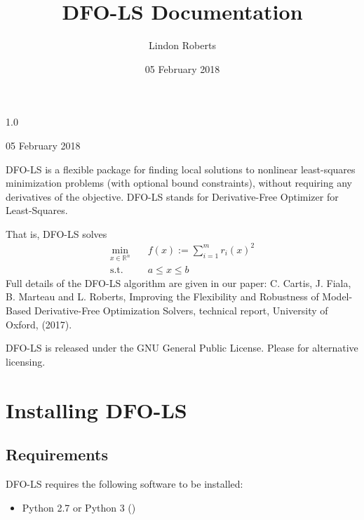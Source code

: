\documentclass[letterpaper,10pt,english]{sphinxmanual}
\title{DFO-LS Documentation}
\date{05 February 2018}
\author{Lindon Roberts}
\begin{document}
\maketitle
\sphinxtableofcontents
{}\label{\detokenize{index::doc}}


 1.0

 05 February 2018

 

DFO-LS is a flexible package for finding local solutions to nonlinear least-squares minimization problems (with optional bound constraints), without requiring any derivatives of the objective. DFO-LS stands for Derivative-Free Optimizer for Least-Squares.

That is, DFO-LS solves
\begin{equation*}
\begin{split}\min_{x\in\mathbb{R}^n}  &\quad  f(x) := \sum_{i=1}^{m}r_{i}(x)^2 \\
\text{s.t.} &\quad  a \leq x \leq b\end{split}
\end{equation*}
Full details of the DFO-LS algorithm are given in our paper: C. Cartis, J. Fiala, B. Marteau and L. Roberts, Improving the Flexibility and Robustness of Model-Based Derivative-Free Optimization Solvers, technical report, University of Oxford, (2017).

DFO-LS is released under the GNU General Public License. Please  for alternative licensing.


\chapter{Installing DFO-LS}
\label{\detokenize{install:installing-dfo-ls}}\label{\detokenize{install:dfo-ls-derivative-free-optimizer-for-least-squares-minimization}}\label{\detokenize{install::doc}}

\section{Requirements}
\label{\detokenize{install:requirements}}
DFO-LS requires the following software to be installed:
\begin{itemize}
\item {} 
Python 2.7 or Python 3 ()

\end{itemize}
\end{document}
